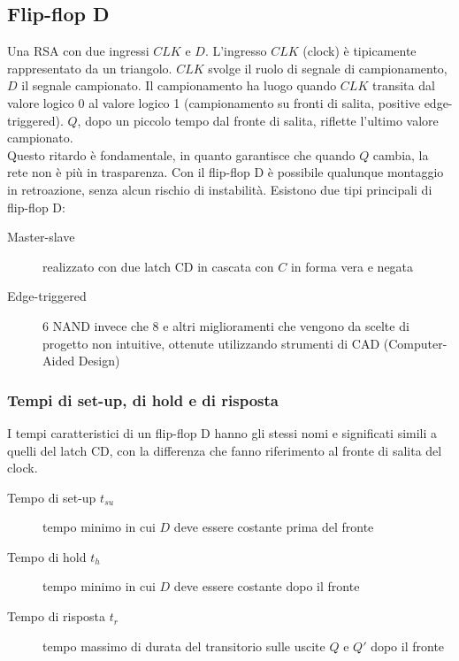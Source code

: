 \documentclass{article}
\begin{document}
\subsection{Flip-flop D}

Una RSA con due ingressi $CLK$ e $D$.
L'ingresso $CLK$ (clock) è tipicamente rappresentato da un triangolo.
$CLK$ svolge il ruolo di segnale di campionamento, $D$ il segnale campionato.
Il campionamento ha luogo quando $CLK$ transita dal valore logico 0 al valore logico 1 (campionamento su fronti di salita, positive edge-triggered).
$Q$, dopo un piccolo tempo dal fronte di salita, riflette l'ultimo valore campionato.\\

\noindent
Questo ritardo è fondamentale, in quanto garantisce che quando $Q$ cambia, la rete non è più in trasparenza.
Con il flip-flop D è possibile qualunque montaggio in retroazione, senza alcun rischio di instabilità.
Esistono due tipi principali di flip-flop D:

\begin{description}
    \item[Master-slave] realizzato con due latch CD in cascata con $C$ in forma vera e negata
    \item[Edge-triggered] 6 NAND invece che 8 e altri miglioramenti che vengono da scelte di progetto non intuitive, ottenute utilizzando strumenti di CAD (Computer-Aided Design)
\end{description}

\subsubsection{Tempi di set-up, di hold e di risposta}

I tempi caratteristici di un flip-flop D hanno gli stessi nomi e significati simili a quelli del latch CD, con la differenza che fanno riferimento al fronte di salita del clock.

\begin{description}
    \item[Tempo di set-up $t_{su}$] tempo minimo in cui $D$ deve essere costante prima del fronte
    \item[Tempo di hold $t_h$] tempo minimo in cui $D$ deve essere costante dopo il fronte
    \item[Tempo di risposta $t_r$] tempo massimo di durata del transitorio sulle uscite $Q$ e $Q'$ dopo il fronte
\end{description}
\end{document}
